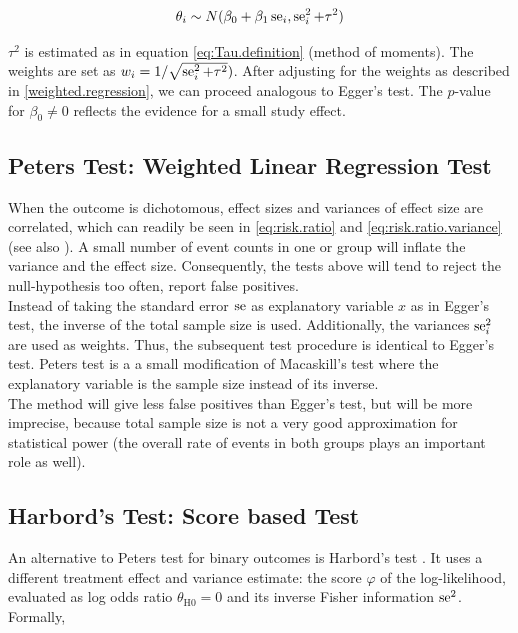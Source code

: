 \documentclass[11pt,a4paper,twoside]{book}\usepackage[]{graphicx}\usepackage[]{color}
\begin{document}
\begin{align}
\theta_i \sim N(\beta_0 + \beta_1 \operatorname{se}_i, \operatorname{se}_i^2 + \tau^2) \label{t.sharp.regression}
\end{align}

$\tau^2$ is estimated as in equation \eqref{eq:Tau.definition} (method of moments). %
The weights are set as $w_i = 1/\sqrt{\operatorname{se}_i^2 + \tau^2})$. After adjusting for the weights as described in \ref{weighted.regression}, we can proceed analogous to Egger's test. The  $p$\hspace{0.4mm}-value for $\beta_{0} \neq 0$ reflects the evidence for a small study effect.


\subsection{Peters Test: Weighted Linear Regression Test} \label{sec:Peter}
When the outcome is dichotomous, effect sizes and variances of effect size are correlated, which can readily be seen in \eqref{eq:risk.ratio} and \eqref{eq:risk.ratio.variance} (see also \cite[p. 120]{meta.w.R}). A small number of event counts in one or group will inflate the variance and the effect size. Consequently, the tests above will tend to reject the null-hypothesis too often, \ie report false positives.\\ 
Instead of taking the standard error $\operatorname{se}$ as explanatory variable $x$ as in Egger's test, the inverse of the total sample size is used. Additionally, the variances $\operatorname{se}_i^2$ are used as weights. Thus, the subsequent test procedure is identical to Egger's test. Peters test is a a small modification of Macaskill's test where the explanatory variable is the sample size instead of its inverse. \\
The method will give less false positives than Egger's test, but will be more imprecise, because total sample size is not a very good approximation for statistical power (the overall rate of events in both groups plays an important role as well).



\subsection{Harbord's Test: Score based Test} \label{sec:Harbord}
An alternative to Peters test for binary outcomes is Harbord's test \citep{Harbord}.
It uses a different treatment effect and variance estimate: the score $\varphi$ of the log-likelihood, evaluated as log odds ratio $\theta_\textrm{H0} = 0$ and its inverse Fisher information $\operatorname{se}^2$. Formally,
\end{document}
